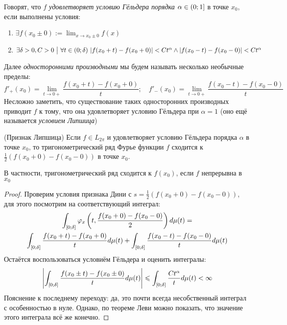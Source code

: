 \begin{definition}
	Говорят, что \textit{$f$ удовлетворяет условию Гёльдера порядка $\alpha \in \left(0; 1\right]$} в точке $x_0$, если выполнены условия:
	\begin{enumerate}
		\item $\exists f(x_0 \pm 0) := \lim_{x \to x_0 \pm 0} f(x)$
		
		\item $\exists \delta > 0, C > 0 \ \big|\  \forall t \in (0; \delta)\ |f(x_0 + t) - f(x_0 + 0)| < Ct^\alpha \wedge |f(x_0 - t) - f(x_0 - 0)| < Ct^\alpha$
	\end{enumerate}
\end{definition}

\begin{note}
	Далее \textit{односторонними производными} мы будем называть несколько необычные пределы:
	\[
		f'_+(x_0) = \lim_{t \to 0+} \frac{f(x_0 + t) - f(x_0 + 0)}{t}; \quad f'_-(x_0) = \lim_{t \to 0+} \frac{f(x_0 - t) - f(x_0 - 0)}{t}
	\]
	Несложно заметить, что существование таких односторонних производных приводит $f$ к тому, что она удовлетворяет условию Гёльдера при $\alpha = 1$ (оно ещё называется \textit{условием Липшица})
\end{note}

\begin{theorem} (Признак Липшица)
	Если $f \in L_{2\pi}$ и удовлетворяет условию Гёльдера порядка $\alpha$ в точке $x_0$, то тригонометрический ряд Фурье функции $f$ сходится к $\frac{1}{2}(f(x_0 + 0) - f(x_0 - 0))$ в точке $x_0$.
\end{theorem}

\begin{note}
	В частности, тригонометрический ряд сходится к $f(x_0)$, если $f$ непрерывна в $x_0$
\end{note}

\begin{proof}
	Проверим условия признака Дини с $s = \frac{1}{2}(f(x_0 + 0) - f(x_0 - 0))$, для этого посмотрим на соответствующий интеграл:
	\begin{multline*}
		\int_{[0; \delta]} \varphi_x\left(t, \frac{f(x_0 + 0) - f(x_0 - 0)}{2}\right)d\mu(t) =
		\\
		\int_{[0; \delta]} \frac{f(x_0 + t) - f(x_0 + 0)}{t}d\mu(t) + \int_{[0; \delta]} \frac{f(x_0 - t) - f(x_0 - 0)}{t}d\mu(t)
	\end{multline*}
	Остаётся воспользоваться условиём Гёльдера и оценить интегралы:
	\[
		\left|\int_{[0; \delta]} \frac{f(x_0 \pm t) - f(x_0 \pm 0)}{t}d\mu(t)\right| \leqslant \int_{[0; \delta]} \frac{Ct^\alpha}{t}d\mu(t) < \infty
	\]
	Пояснение к последнему переходу: да, это почти всегда несобственный интеграл с особенностью в нуле. Однако, по теореме Леви можно показать, что значение этого интеграла всё же конечно.
\end{proof}

